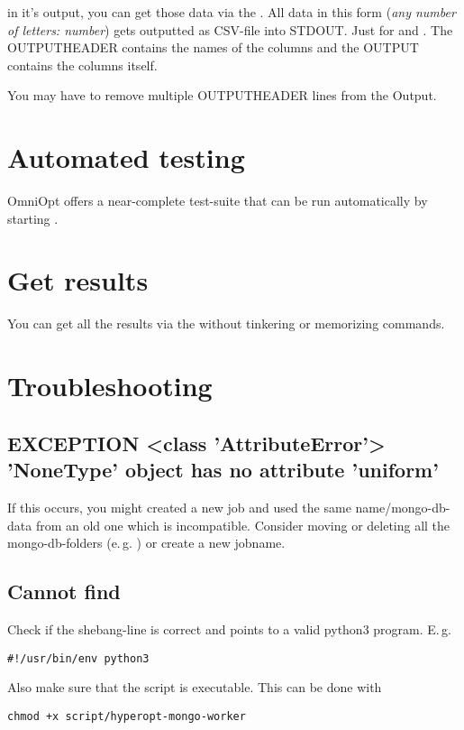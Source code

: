\documentclass[]{scrartcl}
\begin{document}
in it's output, you can get those data via the . All data in this form (\textit{any number of letters: number})
gets outputted as CSV-file into STDOUT. Just  for  and . The OUTPUTHEADER
contains the names of the columns and the OUTPUT contains the columns itself. 

You may have to remove multiple OUTPUTHEADER lines from the Output.

\section{Automated testing}

OmniOpt offers a near-complete test-suite that can be run automatically by starting .

\section{Get results}

You can get all the results via the  without tinkering or memorizing commands.

\section{Troubleshooting}

\subsection{EXCEPTION <class 'AttributeError'> 'NoneType' object has no attribute 'uniform'}

If this occurs, you might created a new job and used the same name/mongo-db-data from an old one which is incompatible.
Consider moving or deleting all the mongo-db-folders (e.\,g. ) or create a new jobname.

\subsection{Cannot find }

Check if the shebang-line is correct and points to a valid python3 program. E.\,g.

\begin{verbatim}
#!/usr/bin/env python3
\end{verbatim}

Also make sure that the script is executable. This can be done with

\begin{verbatim}
chmod +x script/hyperopt-mongo-worker
\end{verbatim}
\end{document}

